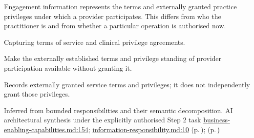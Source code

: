 Engagement information represents the terms and externally granted practice privileges under which a provider participates. This differs from who the practitioner is and from whether a particular operation is authorised now.



Capturing terms of service and clinical privilege agreements.



Make the externally established terms and privilege standing of provider participation available without granting it.



Records externally granted service terms and privileges; it does not independently grant those privileges.


Inferred from bounded responsibilities and their semantic decomposition. AI architectural synthesis under the explicitly authorised Step 2 task \hyperref[evidence:e01893359d483acf]{business-enabling-capabilities.md:154}; \hyperref[evidence:be61392fefb4bb10]{information-responsibility.md:10}
 (p.\,\pageref{cap:bec-practitioner-role});  (p.\,\pageref{cap:bec-reviewed-provider-clinical-qualification-tracking})
